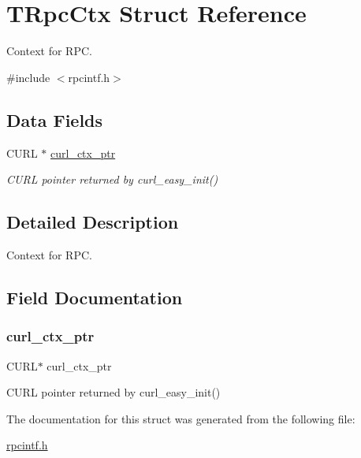 \hypertarget{struct_t_rpc_ctx}{}\section{T\+Rpc\+Ctx Struct Reference}
\label{struct_t_rpc_ctx}


Context for R\+PC.  




{\ttfamily \#include $<$rpcintf.\+h$>$}

\subsection*{Data Fields}
\begin{DoxyCompactItemize}
\item 
C\+U\+RL $\ast$ \mbox{\hyperlink{struct_t_rpc_ctx_a730671c125fd060369198add915cf32f}{curl\+\_\+ctx\+\_\+ptr}}
\begin{DoxyCompactList}\small\item\em C\+U\+RL pointer returned by curl\+\_\+easy\+\_\+init() \end{DoxyCompactList}\end{DoxyCompactItemize}


\subsection{Detailed Description}
Context for R\+PC. 

\subsection{Field Documentation}
\mbox{\label{struct_t_rpc_ctx_a730671c125fd060369198add915cf32f}} 
\subsubsection{\texorpdfstring{curl\+\_\+ctx\+\_\+ptr}{curl\_ctx\_ptr}}
{\footnotesize\ttfamily C\+U\+RL$\ast$ curl\+\_\+ctx\+\_\+ptr}



C\+U\+RL pointer returned by curl\+\_\+easy\+\_\+init() 



The documentation for this struct was generated from the following file\+:\begin{DoxyCompactItemize}
\item 
\mbox{\hyperlink{rpcintf_8h}{rpcintf.\+h}}\end{DoxyCompactItemize}
